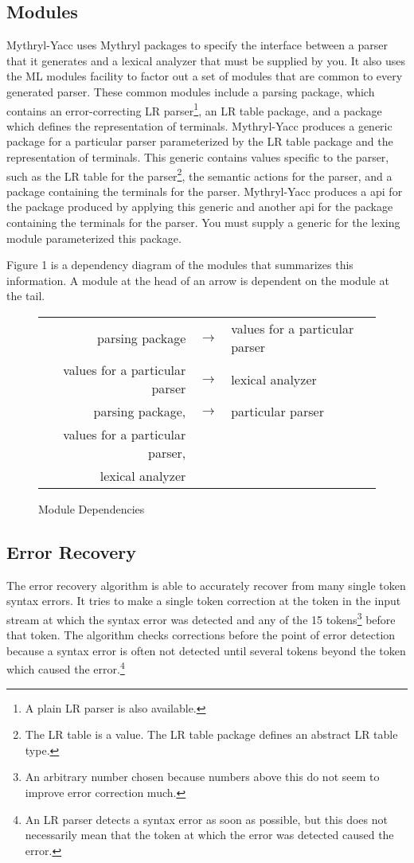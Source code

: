 \subsection{Modules}
Mythryl-Yacc uses Mythryl packages to specify the interface between
a parser that it generates and a lexical analyzer that must be supplied
by you.  It also uses the ML modules facility to factor out
a set of modules that are common to every generated parser.
These common modules include a parsing package, which contains
an error-correcting LR parser\footnote{A plain LR parser is also
available.}, an LR table package, and a package
which defines the representation of terminals.  Mythryl-Yacc produces
a generic package for a particular parser parameterized by the LR table
package and the representation of terminals.  This generic
contains values specific to the parser, such as the
LR table for the parser\footnote{The LR table is a value.  The
LR table package defines an abstract LR table type.}, the
semantic actions for the parser, and a package containing
the terminals for the parser.   Mythryl-Yacc produces a api
for the package produced by applying this generic
and another api for the package containing the terminals for
the parser.  You must
supply a generic for the lexing module parameterized this
package.

Figure 1 is a dependency diagram of the modules that summarizes this
information.  A module at the head of an arrow is dependent
on the module at the tail.

\begin{figure}
\begin{tabular}{|rcl|}
\hline
parsing package & $\longrightarrow$ & values for a particular parser\\
values for a particular parser & $\longrightarrow$ & lexical analyzer\\
parsing package, & $\longrightarrow$ & particular parser\\
values for a particular parser, & & \\
lexical analyzer & & \\
\hline
\end{tabular}
\caption{Module Dependencies}
\end{figure}

\subsection{Error Recovery}

The error recovery algorithm is able to accurately recover from many
single token syntax errors.  It tries to make a single token
correction at the token in the input stream at which the syntax error
was detected and any of the 15 tokens\footnote{An arbitrary number
chosen because numbers above this do not seem to improve error
correction much.} before that token.  The algorithm checks corrections
before the point of error detection because a syntax error is often
not detected until several tokens beyond the token which caused the
error.\footnote{An LR parser detects a syntax error as soon as
possible, but this does not necessarily mean that the token at which
the error was detected caused the error.}

